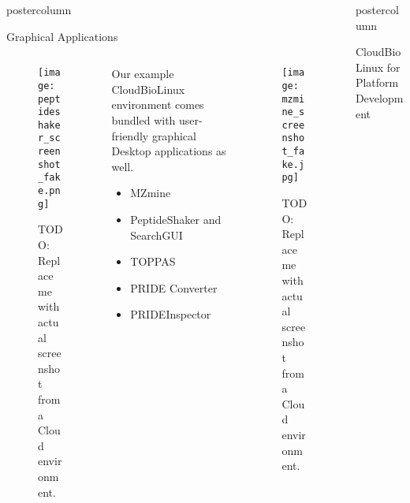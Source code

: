 \documentclass[final]{beamer}
\newlength{\columnheight}
\begin{document}
\begin{frame}
\begin{columns}
\begin{column}{.5\textwidth}
\begin{beamercolorbox}[center,wd=\textwidth]{postercolumn}
\begin{minipage}[T]{.95\textwidth}
{\begin{block}{Graphical Applications}
            \begin{columns}
              \begin{column}{.30\textwidth}
                \begin{figure}
                  \texttt{[image: peptideshaker\_screenshot\_fake.png]} \\
                  \caption{TODO: Replace me with actual screenshot from a Cloud environment.}
                \end{figure}                   
              \end{column}
              \begin{column}{.39\textwidth}
                Our example CloudBioLinux environment comes bundled with user-friendly graphical Desktop applications as well.
                \begin{itemize}
                  \item MZmine
                  \item PeptideShaker and SearchGUI
                  \item TOPPAS
                  \item PRIDE Converter
                  \item PRIDEInspector
                \end{itemize}
              \end{column}
              \begin{column}{.30\textwidth}
                \begin{figure}
                  \texttt{[image: mzmine\_screenshot\_fake.jpg]}
                  \caption{TODO: Replace me with actual screenshot from a Cloud environment.}
                \end{figure}
              \end{column}              
            \end{columns}
            \end{block}
          }
        \end{minipage}
      \end{beamercolorbox}
    \end{column}

    \begin{column}{.5\textwidth}
      \begin{beamercolorbox}[center,wd=\textwidth]{postercolumn}
        \begin{minipage}[T]{.95\textwidth} %
          \parbox[t][\columnheight]{\textwidth}{
            \begin{block}{CloudBioLinux for Platform Development}


\end{block}}
\end{minipage}
\end{beamercolorbox}
\end{column}
\end{columns}
\end{frame}
\end{document}
